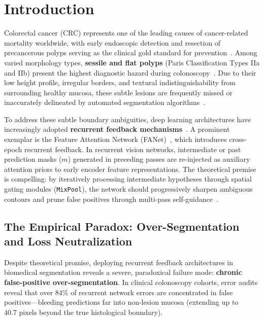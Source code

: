 \section{Introduction}
\label{sec:intro}

Colorectal cancer (CRC) represents one of the leading causes of
cancer-related mortality worldwide, with early endoscopic detection and
resection of precancerous polyps serving as the clinical gold standard
for prevention~\cite{siegel2023colorectal, leufkens2012factors}. Among
varied morphology types, \textbf{sessile and flat polyps} (Paris
Classification Types IIa and IIb) present the highest diagnostic hazard
during colonoscopy~\cite{paris2003endoscopic}. Due to their low height
profile, irregular borders, and textural indistinguishability from
surrounding healthy mucosa, these subtle lesions are frequently missed
or inaccurately delineated by automated segmentation
algorithms~\cite{jha2020kvasir, bernal2017comparative}.

To address these subtle boundary ambiguities, deep learning architectures
have increasingly adopted \textbf{recurrent feedback mechanisms}~\cite{tomar2021fanet,
liang2015recurrent, alom2018recurrent}. A prominent exemplar is the Feature
Attention Network (FANet)~\cite{tomar2021fanet}, which introduces cross-epoch
recurrent feedback. In recurrent vision networks, intermediate or past
prediction masks ($m$) generated in preceding passes are re-injected as
auxiliary attention priors to early encoder feature representations. The
theoretical premise is compelling: by iteratively processing intermediate
hypotheses through spatial gating modules (\texttt{MixPool}), the network
should progressively sharpen ambiguous contours and prune false positives
through multi-pass self-guidance~\cite{tomar2021fanet, tomar2021ddanet}.

\subsection{The Empirical Paradox: Over-Segmentation and Loss Neutralization}
Despite theoretical promise, deploying recurrent feedback architectures in
biomedical segmentation reveals a severe, paradoxical failure mode:
\textbf{chronic false-positive over-segmentation}. In clinical colonoscopy
cohorts, error audits reveal that over $84\%$ of recurrent network errors
are concentrated in false positives---bleeding predictions far into non-lesion
mucosa (extending up to $40.7\text{ pixels}$ beyond the true histological boundary).

